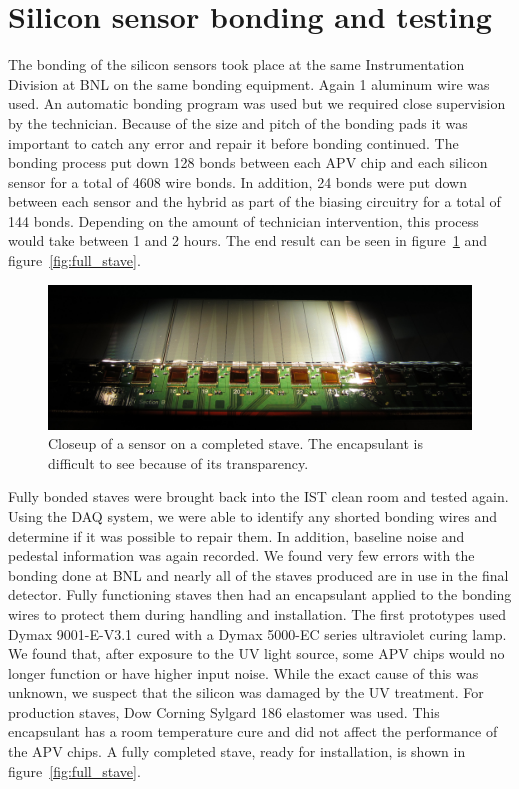 \documentclass[1p,12pt]{elsarticle}
\begin{document}
\section{Silicon sensor bonding and testing}
The bonding of the silicon sensors took place at the same Instrumentation
Division at BNL on the same bonding equipment. Again \SI{1}{\mil} aluminum wire was
used. An automatic bonding program was used but we required close supervision by
the technician. Because of the size and pitch of the bonding pads it was
important to catch any error and repair it before bonding continued. The
bonding process put down 128 bonds between each APV chip and each silicon sensor
for a total of 4608 wire bonds. In addition, 24 bonds were put down between
each sensor and the hybrid as part of the biasing circuitry for a total of 144
bonds. Depending on the amount of technician intervention, this process would
take between 1 and 2 hours.  The end result can be seen in figure~\ref{fig:si_bonded}
and figure~\ref{fig:full_stave}.

\begin{figure}[h]
\begin{center}
\includegraphics[width=6.5in, keepaspectratio=true, angle=0]{graphics/si_bonded.jpg}
\caption{Closeup of a sensor on a completed stave.  The encapsulant is difficult
to see because of its transparency.
\label{fig:si_bonded}}
\end{center}
\end{figure}
%
Fully bonded staves were brought back into the IST clean room and tested
again. Using the DAQ system, we were able to identify any shorted bonding wires
and determine if it was possible to repair them. In addition, baseline noise
and pedestal information was again recorded. We found very few errors with the
bonding done at BNL and nearly all of the staves produced are in use in the
final detector. Fully functioning staves then had an encapsulant applied to the
bonding wires to protect them during handling and installation. The first
prototypes used Dymax 9001-E-V3.1 cured with a Dymax 5000-EC series ultraviolet
curing lamp. We found that, after exposure to the UV light source, some APV chips
would no longer function or have higher input noise. While the exact cause of
this was unknown, we suspect that the silicon was damaged by the UV treatment.
For production staves, Dow Corning Sylgard 186 elastomer was used. This
encapsulant has a room temperature cure and did not affect the performance of
the APV chips.  A fully completed stave, ready for installation, is shown in
figure~\ref{fig:full_stave}.
\end{document}

